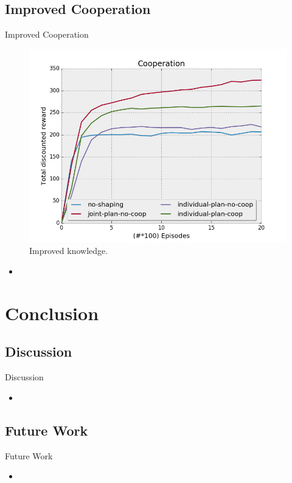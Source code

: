\documentclass{bredelebeamer}
\begin{document}
\subsection{Improved Cooperation}
\begin{frame}{Improved Cooperation}


\begin{figure}[h!]
  \includegraphics[height=0.4\textheight]{../article/img/coop.png}
  \caption{Improved knowledge.}
  \label{fig:results2}
\end{figure}

\begin{block}{}
\begin{itemize}
\item 
\end{itemize}
\end{block}

\end{frame}


\section{Conclusion}

\subsection{Discussion}
\begin{frame}{Discussion}

\begin{block}{}
\begin{itemize}
\item 
\end{itemize}
\end{block}

\end{frame}

\subsection{Future Work}
\begin{frame}{Future Work}

\begin{block}{}
\begin{itemize}
\item 
\end{itemize}
\end{block}

\end{frame}
\end{document}
